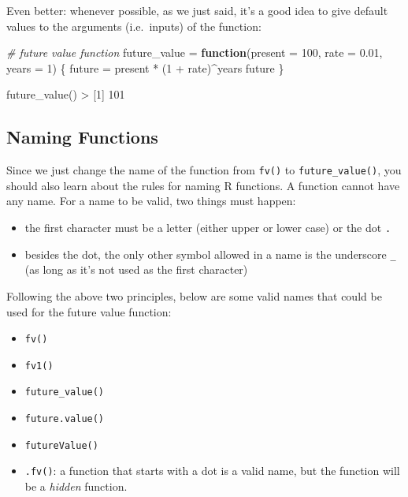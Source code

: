 \documentclass[
]{book}
\newenvironment{Shaded}{\begin{snugshade}}{\end{snugshade}}
\newcommand{\AttributeTok}[1]{\textcolor[rgb]{0.77,0.63,0.00}{#1}}
\newcommand{\CommentTok}[1]{\textcolor[rgb]{0.56,0.35,0.01}{\textit{#1}}}
\newcommand{\ControlFlowTok}[1]{\textcolor[rgb]{0.13,0.29,0.53}{\textbf{#1}}}
\newcommand{\DecValTok}[1]{\textcolor[rgb]{0.00,0.00,0.81}{#1}}
\newcommand{\FloatTok}[1]{\textcolor[rgb]{0.00,0.00,0.81}{#1}}
\newcommand{\FunctionTok}[1]{\textcolor[rgb]{0.00,0.00,0.00}{#1}}
\newcommand{\NormalTok}[1]{#1}
\newcommand{\OtherTok}[1]{\textcolor[rgb]{0.56,0.35,0.01}{#1}}
\newcommand{\SpecialCharTok}[1]{\textcolor[rgb]{0.00,0.00,0.00}{#1}}
\begin{document}
Even better: whenever possible, as we just said, it's a good idea to give
default values to the arguments (i.e.~inputs) of the function:

\begin{Shaded}
\begin{Highlighting}[]
\CommentTok{\# future value function}
\NormalTok{future\_value }\OtherTok{=} \ControlFlowTok{function}\NormalTok{(}\AttributeTok{present =} \DecValTok{100}\NormalTok{, }\AttributeTok{rate =} \FloatTok{0.01}\NormalTok{, }\AttributeTok{years =} \DecValTok{1}\NormalTok{) \{}
\NormalTok{  future }\OtherTok{=}\NormalTok{ present }\SpecialCharTok{*}\NormalTok{ (}\DecValTok{1} \SpecialCharTok{+}\NormalTok{ rate)}\SpecialCharTok{\^{}}\NormalTok{years}
\NormalTok{  future}
\NormalTok{\}}

\FunctionTok{future\_value}\NormalTok{()}
\SpecialCharTok{\textgreater{}}\NormalTok{ [}\DecValTok{1}\NormalTok{] }\DecValTok{101}
\end{Highlighting}
\end{Shaded}

\hypertarget{naming-functions}{%
\subsection{Naming Functions}\label{naming-functions}}

Since we just change the name of the function from \texttt{fv()} to \texttt{future\_value()},
you should also learn about the rules for naming R functions. A function cannot
have any name. For a name to be valid, two things must happen:

\begin{itemize}
\item
  the first character must be a letter (either upper or lower case) or the
  dot \texttt{.}
\item
  besides the dot, the only other symbol allowed in a name is the underscore
  \texttt{\_} (as long as it's not used as the first character)
\end{itemize}

Following the above two principles, below are some valid names that could be
used for the future value function:

\begin{itemize}
\item
  \texttt{fv()}
\item
  \texttt{fv1()}
\item
  \texttt{future\_value()}
\item
  \texttt{future.value()}
\item
  \texttt{futureValue()}
\item
  \texttt{.fv()}: a function that starts with a dot is a valid name, but the
  function will be a \emph{hidden} function.
\end{itemize}
\end{document}
